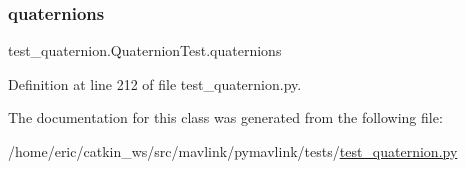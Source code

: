 \subsubsection{\texorpdfstring{quaternions}{quaternions}}
{\footnotesize\ttfamily test\+\_\+quaternion.\+Quaternion\+Test.\+quaternions}



Definition at line 212 of file test\+\_\+quaternion.\+py.



The documentation for this class was generated from the following file\+:\begin{DoxyCompactItemize}
\item 
/home/eric/catkin\+\_\+ws/src/mavlink/pymavlink/tests/\mbox{\hyperlink{test__quaternion_8py}{test\+\_\+quaternion.\+py}}\end{DoxyCompactItemize}
